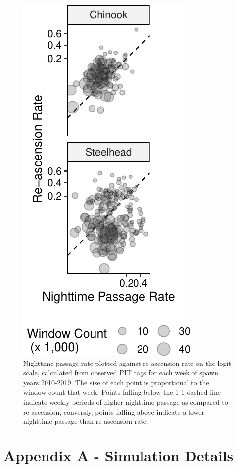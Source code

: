 \documentclass[
  12pt,
]{article}
\begin{document}
\newpage

\begin{figure}
\centering
\includegraphics{../figures/night-reasc-diff-fig-1.pdf}
\caption{\label{fig:night-reasc-diff-fig}Nighttime passage rate plotted against re-ascension rate on the logit scale, calculated from observed PIT tags for each week of spawn years 2010-2019. The size of each point is proportional to the window count that week. Points falling below the 1-1 dashed line indicate weekly periods of higher nighttime passage as compared to re-ascension, conversly, points falling above indicate a lower nighttime passage than re-ascension rate.}
\end{figure}

\newpage

\hypertarget{append1}{%
\section{Appendix A - Simulation Details}\label{append1}}
\end{document}

